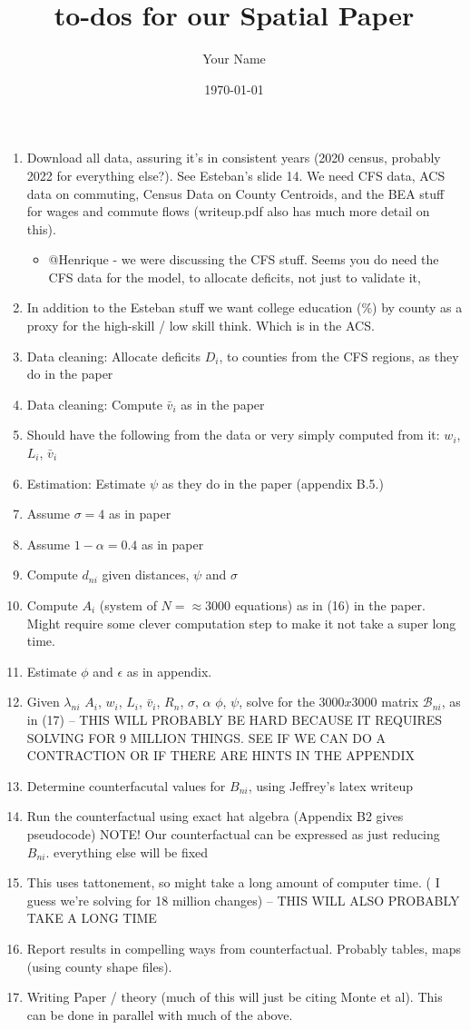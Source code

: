 \documentclass{article}
\title{to-dos for our Spatial Paper}
\author{Your Name}
\date{\today}
\begin{document}
\maketitle
\begin{enumerate}
    \item Download all data, assuring it's in consistent years (2020 census, probably 2022 for everything else?). See Esteban's slide 14. We need CFS data, ACS data on commuting, Census Data on County Centroids, and the BEA stuff for wages and commute flows (writeup.pdf also has much more detail on this).
    
    \begin{itemize}
        \item @Henrique - we were discussing the CFS stuff. Seems you do need the CFS data for the model, to allocate deficits, not just to validate it, 
    \end{itemize}
    \item In addition to the Esteban stuff we want college education (\%) by county as a proxy for the high-skill / low skill think. Which is in the ACS. 
    \item Data cleaning: Allocate deficits $D_i$, to counties from the CFS regions, as they do in the paper
    \item Data cleaning: Compute $\bar v_i$ as in the paper 
    \item Should have the following from the data or very simply computed from it: $w_i$, $L_i$, $\bar v_i$
    \item Estimation: Estimate $\psi$ as they do in the paper (appendix B.5.)
    \item Assume $\sigma = 4$ as in paper
    \item Assume $1-\alpha = 0.4$ as in paper
    \item Compute $d_{ni}$ given distances, $\psi$ and $\sigma$
    \item Compute $A_i$ (system of $N = \approx 3000$ equations) as in (16) in the paper. Might require some clever computation step to make it not take a super long time.
    \item Estimate $\phi$ and $\epsilon$ as in appendix. 
    \item Given $\lambda_{ni}$ $A_i$, $w_i$, $L_i$, $\bar v_i$, $R_n$, $\sigma$, $\alpha$ $\phi$, $\psi$, solve for the $3000x3000$ matrix $\mathcal{B}_{ni}$, as in (17) -- THIS WILL PROBABLY BE HARD BECAUSE IT REQUIRES SOLVING FOR 9 MILLION THINGS. SEE IF WE CAN DO A CONTRACTION OR IF THERE ARE HINTS IN THE APPENDIX
    \item Determine counterfacutal values for $B_{ni}$, using Jeffrey's latex writeup
    \item Run the counterfactual using exact hat algebra (Appendix B2 gives pseudocode)  NOTE! Our counterfactual can be expressed as just reducing $B_{ni}$. everything else will be fixed
    \item This uses tattonement, so might take a long amount of computer time. ( I guess we're solving for 18 million changes) -- THIS WILL ALSO PROBABLY TAKE A LONG TIME
    
    \item  Report results in compelling ways from counterfactual. Probably tables, maps (using county shape files). 
    \item Writing Paper / theory  (much of this will just be citing Monte et al). This can be done in parallel with much of the above.
\end{enumerate}
\end{document}
